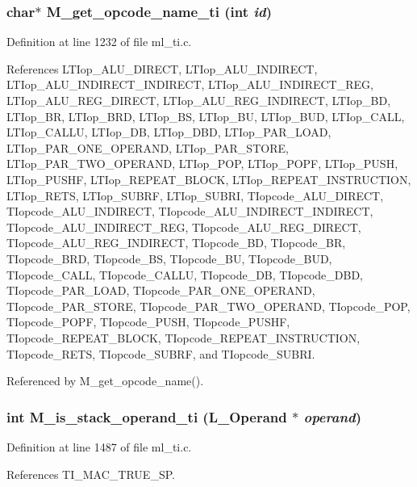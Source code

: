 \subsubsection{\setlength{\rightskip}{0pt plus 5cm}char$\ast$ M\_\-get\_\-opcode\_\-name\_\-ti (int {\em id})}\label{ml__ti_8c_4732884a2388381c9aa84c4b45adfd26}




Definition at line 1232 of file ml\_\-ti.c.

References LTIop\_\-ALU\_\-DIRECT, LTIop\_\-ALU\_\-INDIRECT, LTIop\_\-ALU\_\-INDIRECT\_\-INDIRECT, LTIop\_\-ALU\_\-INDIRECT\_\-REG, LTIop\_\-ALU\_\-REG\_\-DIRECT, LTIop\_\-ALU\_\-REG\_\-INDIRECT, LTIop\_\-BD, LTIop\_\-BR, LTIop\_\-BRD, LTIop\_\-BS, LTIop\_\-BU, LTIop\_\-BUD, LTIop\_\-CALL, LTIop\_\-CALLU, LTIop\_\-DB, LTIop\_\-DBD, LTIop\_\-PAR\_\-LOAD, LTIop\_\-PAR\_\-ONE\_\-OPERAND, LTIop\_\-PAR\_\-STORE, LTIop\_\-PAR\_\-TWO\_\-OPERAND, LTIop\_\-POP, LTIop\_\-POPF, LTIop\_\-PUSH, LTIop\_\-PUSHF, LTIop\_\-REPEAT\_\-BLOCK, LTIop\_\-REPEAT\_\-INSTRUCTION, LTIop\_\-RETS, LTIop\_\-SUBRF, LTIop\_\-SUBRI, TIopcode\_\-ALU\_\-DIRECT, TIopcode\_\-ALU\_\-INDIRECT, TIopcode\_\-ALU\_\-INDIRECT\_\-INDIRECT, TIopcode\_\-ALU\_\-INDIRECT\_\-REG, TIopcode\_\-ALU\_\-REG\_\-DIRECT, TIopcode\_\-ALU\_\-REG\_\-INDIRECT, TIopcode\_\-BD, TIopcode\_\-BR, TIopcode\_\-BRD, TIopcode\_\-BS, TIopcode\_\-BU, TIopcode\_\-BUD, TIopcode\_\-CALL, TIopcode\_\-CALLU, TIopcode\_\-DB, TIopcode\_\-DBD, TIopcode\_\-PAR\_\-LOAD, TIopcode\_\-PAR\_\-ONE\_\-OPERAND, TIopcode\_\-PAR\_\-STORE, TIopcode\_\-PAR\_\-TWO\_\-OPERAND, TIopcode\_\-POP, TIopcode\_\-POPF, TIopcode\_\-PUSH, TIopcode\_\-PUSHF, TIopcode\_\-REPEAT\_\-BLOCK, TIopcode\_\-REPEAT\_\-INSTRUCTION, TIopcode\_\-RETS, TIopcode\_\-SUBRF, and TIopcode\_\-SUBRI.

Referenced by M\_\-get\_\-opcode\_\-name().
\subsubsection{\setlength{\rightskip}{0pt plus 5cm}int M\_\-is\_\-stack\_\-operand\_\-ti (L\_\-Operand $\ast$ {\em operand})}\label{ml__ti_8c_39785d8ee8a076ab945940addf0a3084}




Definition at line 1487 of file ml\_\-ti.c.

References TI\_\-MAC\_\-TRUE\_\-SP.

